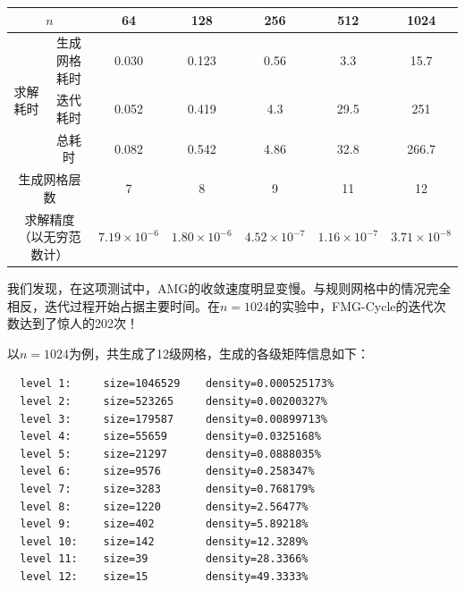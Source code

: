 \documentclass[lang=cn,10pt]{elegantbook}
\begin{document}
\begin{table}[H]
  \centering
  \begin{tabular}{ccccccc}
  \multicolumn{2}{c}{\textbf{$n$}}                                           & 64    & 128   & 256   & 512   & 1024  \\ \hline
  \multicolumn{1}{c|}{\multirow{3}{*}{求解耗时}} & \multicolumn{1}{c|}{生成网格耗时} & 0.030 & 0.123 & 0.56 & 3.3   & 15.7  \\
  \multicolumn{1}{c|}{}                        & \multicolumn{1}{c|}{迭代耗时}   & 0.052 & 0.419 & 4.3 & 29.5 &  251 \\
  \multicolumn{1}{c|}{}                        & \multicolumn{1}{c|}{总耗时}    & 0.082 & 0.542 & 4.86 & 32.8 & 266.7 \\ \cline{1-2}
  \multicolumn{2}{c|}{生成网格层数}                                                & 7 & 8 & 9 & 11 & 12 \\ \cline{1-2}
  \multicolumn{2}{c|}{求解精度（以无穷范数计）}                                                   &  $7.19\times 10^{-6}$ & $1.80\times 10^{-6}$ & $4.52\times 10^{-7}$   & $1.16\times 10^{-7}$    &  $3.71\times 10^{-8}$
  \end{tabular}
\end{table}

我们发现，在这项测试中，AMG的收敛速度明显变慢。与规则网格中的情况完全相反，迭代过程开始占据主要时间。在$n=1024$的实验中，FMG-Cycle的迭代次数达到了惊人的202次！

以$n=1024$为例，共生成了12级网格，生成的各级矩阵信息如下：
\begin{lstlisting}
  level 1:     size=1046529    density=0.000525173%
  level 2:     size=523265     density=0.00200327%
  level 3:     size=179587     density=0.00899713%
  level 4:     size=55659      density=0.0325168%
  level 5:     size=21297      density=0.0888035%
  level 6:     size=9576       density=0.258347%
  level 7:     size=3283       density=0.768179%
  level 8:     size=1220       density=2.56477%
  level 9:     size=402        density=5.89218%
  level 10:    size=142        density=12.3289%
  level 11:    size=39         density=28.3366%
  level 12:    size=15         density=49.3333%
\end{lstlisting}
\end{document}
